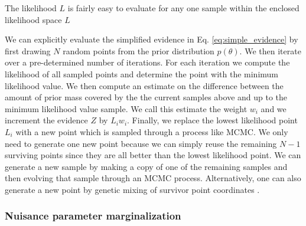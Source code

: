 The likelihood $L$ is fairly easy to evaluate for any one sample within the enclosed likelihood space $L$ 

We can explicitly evaluate the simplified evidence in Eq. \ref{eq:simple_evidence} by first drawing $N$ random points from the prior distribution $p(\theta)$. We then iterate over a pre-determined number of iterations. For each iteration we compute the likelihood of all sampled points and determine the point with the minimum likelihood value. We then compute an estimate on the difference between the amount of prior mass covered by the the current samples above and up to the minimum likelihood value sample. We call this estimate the weight $w_i$ and we increment the evidence $Z$ by $L_i w_i$. Finally, we replace the lowest likelihood point $L_i$ with a new point which is sampled through a process like \ac{MCMC}. We only need to generate one new point because we can simply reuse the remaining $N-1$ surviving points since they are all better than the lowest likelihood point. We can generate a new sample by making a copy of one of the remaining samples and then evolving that sample through an \ac{MCMC} process. Alternatively, one can also generate a new point by genetic mixing of survivor point coordinates \cite{skilling2006}.

%
%

\subsubsection{Nuisance parameter marginalization}